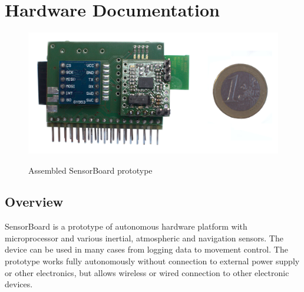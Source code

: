 \chapter{Hardware Documentation}
\label{hardwareDocumentation}

\begin{figure}[H]
	\centering
	\includegraphics[width=16cm]{img/HWassembled.jpg}
	\label{HWassembled}
	\caption{Assembled SensorBoard prototype}
\end{figure}

\section{Overview}
SensorBoard is a prototype of autonomous hardware platform with microprocessor and various inertial, atmospheric and navigation sensors. The device can be used in many cases from logging data to movement control. The prototype works fully autonomously without connection to external power supply or other electronics, but allows wireless or wired connection to other electronic devices.

